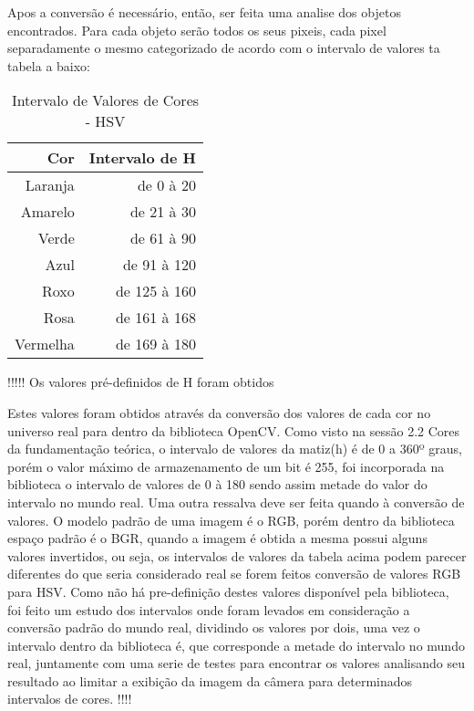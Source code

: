 Apos a conversão é necessário, então, ser feita uma analise dos objetos encontrados. Para cada objeto serão todos os seus pixeis, cada pixel separadamente o mesmo categorizado de acordo com o intervalo de valores ta tabela a baixo:

\begin{table}[h]
\centering
\begin{tabular}{r|r}
Cor & Intervalo de H \\ %
\hline                               %
Laranja & de 0 à 20 \\
\hline 
Amarelo & de 21 à 30\\
\hline 
Verde & de 61 à 90 \\
\hline 
Azul& de 91 à 120 \\
\hline 
Roxo & de 125 à 160 \\
\hline 
Rosa & de 161 à 168 \\
\hline 
Vermelha & de 169 à 180 \\
\hline 
\end{tabular}
\caption{Intervalo de Valores de Cores - HSV}
\end{table}

!!!!!
Os valores pré-definidos de H foram obtidos 


Estes valores foram obtidos através da conversão dos valores de cada cor no universo real para dentro da biblioteca OpenCV. Como visto na sessão 2.2 Cores da fundamentação teórica, o intervalo de valores da matiz(h) é de 0 a 360º graus, porém o valor máximo de armazenamento de um bit é 255, foi incorporada na biblioteca o intervalo de valores de 0 à 180 sendo assim metade do valor do intervalo no mundo real. Uma outra ressalva deve ser feita quando à conversão de valores. O modelo padrão de uma imagem é o RGB, porém dentro da biblioteca espaço padrão é o BGR, quando a imagem é obtida a mesma possui alguns valores invertidos, ou seja, os intervalos de valores da tabela acima podem parecer diferentes do que seria considerado real se forem feitos conversão de valores RGB para HSV.
Como não há pre-definição destes valores disponível pela biblioteca, foi feito um estudo dos intervalos onde foram levados em consideração a conversão padrão do mundo real, dividindo os valores por dois, uma vez o intervalo dentro da biblioteca é, que corresponde a metade do intervalo no mundo real, juntamente com uma serie de testes para encontrar os valores analisando seu resultado ao limitar a exibição da imagem da câmera para determinados intervalos de cores.
!!!!

